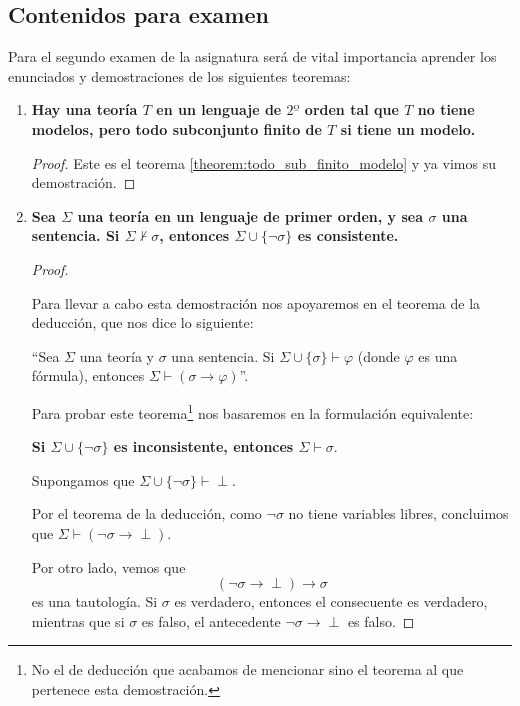 \subsection{Contenidos para examen} 

Para el segundo examen de la asignatura será de vital importancia aprender los enunciados y demostraciones de los siguientes teoremas:

	
\begin{enumerate}
	\item \textbf{Hay una teoría $T$ en un lenguaje de $2º$ orden tal que $T$ no tiene modelos, pero todo subconjunto finito de $T$ si tiene un modelo.}

\begin{proof}
Este es el teorema \ref{theorem:todo_sub_finito_modelo} y ya vimos su demostración.
\end{proof}

	\item \textbf{Sea $\Sigma$ una teoría en un lenguaje de primer orden, y sea $\sigma$ una sentencia. Si $\Sigma \nvdash \sigma$, entonces $\Sigma\cup \{\neg\sigma\}$ es consistente.}

\begin{proof}
	\begin{mdframed}
	Para llevar a cabo esta demostración nos apoyaremos en el teorema de la deducción, que nos dice lo siguiente: 

	``Sea $\Sigma$ una teoría y $\sigma$ una sentencia. Si $\Sigma \cup \{\sigma\}\vdash \varphi$ (donde $\varphi$ es una fórmula), entonces $\Sigma\vdash \left(\sigma \to \varphi\right)$''.
	\end{mdframed}
	
	Para probar este teorema\footnote{No el de deducción que acabamos de mencionar sino el teorema al que pertenece esta demostración.} nos basaremos en la formulación equivalente:

	\textbf{Si $\Sigma\cup \{\neg\sigma\}$ es inconsistente, entonces $\Sigma\vdash\sigma$}.
	
	Supongamos que $\Sigma\cup\{\neg\sigma\}\vdash \perp$. 

	Por el teorema de la deducción, como $\neg\sigma$ no tiene variables libres, concluimos que $\Sigma\vdash \left(\neg\sigma\to \perp\right)$. 

	Por otro lado, vemos que 
	\[\left(\neg \sigma \to \perp\right)\to\sigma\]
	es una tautología. Si $\sigma$ es verdadero, entonces el consecuente es verdadero, mientras que si $\sigma$ es falso, el antecedente $\neg\sigma\to\perp$ es falso. 


\end{proof}
\end{enumerate}
